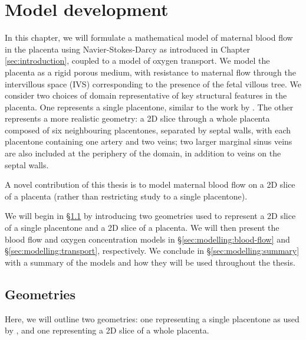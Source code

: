 \chapter{Model development} \label{sec:modelling} 
    In this chapter, we will formulate a mathematical model of maternal blood flow in the placenta using Navier-Stokes-Darcy as introduced in Chapter \ref{sec:introduction}, coupled to a model of oxygen transport. We model the placenta as a rigid porous medium, with resistance to maternal flow through the intervillous space (IVS) corresponding to the presence of the fetal villous tree. We consider two choices of domain representative of key structural features in the placenta. One represents a single placentone, similar to the work by \citeauthor{lecarpentierComputationalFluidDynamic2016} \cite{lecarpentierComputationalFluidDynamic2016}. The other represents a more realistic geometry: a 2D slice through a whole placenta composed of six neighbouring placentones, separated by septal walls, with each placentone containing one artery and two veins; two larger marginal sinus veins are also included at the periphery of the domain, in addition to veins on the septal walls.
    
    A novel contribution of this thesis is to model maternal blood flow on a 2D slice of a placenta (rather than restricting study to a single placentone).
    
    We will begin in \S\ref{sec:modelling:geometries} by introducing two geometries used to represent a 2D slice of a single placentone and a 2D slice of a placenta. We will then present the blood flow and oxygen concentration models in \S\ref{sec:modelling:blood-flow} and \S\ref{sec:modelling:transport}, respectively. We conclude in \S\ref{sec:modelling:summary} with a summary of the models and how they will be used throughout the thesis. 


    \section{Geometries} \label{sec:modelling:geometries}
        Here, we will outline two geometries: one representing a single placentone as used by \citeauthor{lecarpentierComputationalFluidDynamic2016} \cite{lecarpentierComputationalFluidDynamic2016}, and one representing a 2D slice of a whole placenta.
        
